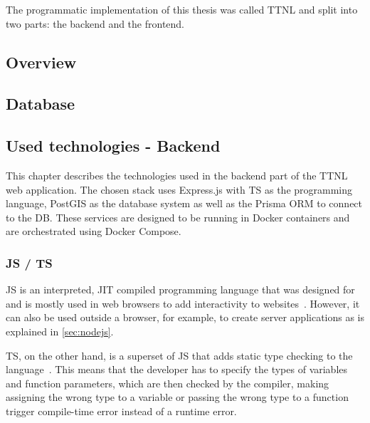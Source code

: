 The programmatic implementation of this thesis was called \acf{TTNL} and split into two parts: the backend and the frontend.

\subsection{Overview}



\subsection{Database}


\subsection{Used technologies - Backend}

This chapter describes the technologies used in the backend part of the \ac{TTNL} web application.
The chosen stack uses Express.js with \ac{TS} as the programming language, PostGIS as the database system as well as the Prisma \ac{ORM} to connect to the \ac{DB}.
These services are designed to be running in Docker containers and are orchestrated using Docker Compose.

\subsubsection{\acf{JS} / \acf{TS}}

\ac{JS} is an interpreted, \ac{JIT} compiled programming language that was designed for and is mostly used in web browsers to add interactivity to websites~\cite{mdn_javascript_2023}.
However, it can also be used outside a browser, for example, to create server applications as is explained in \cref{sec:nodejs}.

\ac{TS}, on the other hand, is a superset of \ac{JS} that adds static type checking to the language~\cite{microsoft_javascript_nodate}.
This means that the developer has to specify the types of variables and function parameters, which are then checked by the compiler, making assigning the wrong type to a variable or passing the wrong type to a function trigger compile-time error instead of a runtime error.

